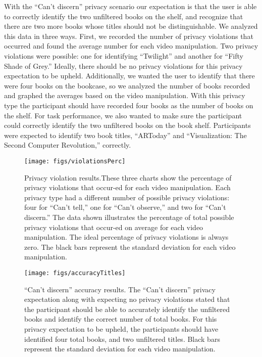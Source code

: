 \documentclass{acm_proc_article-sp}
\begin{document}
With the ``Can't discern'' privacy scenario our expectation is that the user is able to correctly identify the two unfiltered books on the shelf, and recognize that there are two more books whose titles should not be distinguishable. We analyzed this data in three ways. First, we recorded the number of privacy violations that occurred and found the average number for each video manipulation. Two privacy violations were possible: one for identifying ``Twilight'' and another for ``Fifty Shade of Grey.'' Ideally, there should be no privacy violations for this privacy expectation to be upheld. Additionally, we wanted the user to identify that there were four books on the bookcase, so we analyzed the number of books recorded and graphed the averages based on the video manipulation. With this privacy type the participant should have recorded four books as the number of books on the shelf. For task performance, we also wanted to make sure the participant could correctly identify the two unfiltered books on the book shelf. Participants were expected to identify two book titles, ``ARToday'' and ``Visualization: The Second Computer Revolution,''  correctly.



\begin{figure*}
\centering
\texttt{[image: figs/violationsPerc]}
\caption[Violations Results]{Privacy violation results.These three charts show the percentage of privacy violations that occur-ed for each video manipulation. Each privacy type had a different number of possible privacy violations: four for ``Can't tell,'' one for ``Can't observe,'' and two for ``Can't discern.'' The data shown illustrates the percentage of total possible privacy violations that occur-ed on average for each video manipulation. The ideal percentage of privacy violations is always zero. The black bars represent the standard deviation for each video manipulation.}
\label{fig:violations}
\end{figure*}

\begin{figure*}
\centering
\texttt{[image: figs/accuracyTitles]}
\caption[Accuracy Results]{``Can't discern'' accuracy results. The ``Can't discern'' privacy expectation along with expecting no privacy violations stated that the participant should be able to accurately identify the unfiltered books and identify the correct number of total books. For this privacy expectation to be upheld, the participants should have identified four total books, and two unfiltered titles. Black bars represent the standard deviation for each video manipulation.}
\label{fig:accuracy}
\end{figure*}
\end{document}
